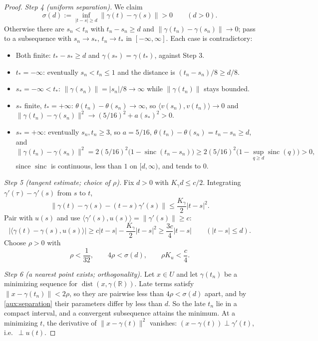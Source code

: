\documentclass[11pt]{article}
\newcommand{\R}{\mathbb R}
\newcommand{\norm}[1]{\lVert #1\rVert}
\newcommand{\ip}[2]{\langle #1,#2\rangle}
\DeclareMathOperator{\dist}{dist}
\DeclareMathOperator{\sinc}{sinc}
\theoremstyle{definition}
\numberwithin{equation}{section}
\begin{document}
\begin{proof}
\emph{Step 4 (uniform separation).} We claim
\begin{equation}\label{aux:separation}
 \sigma(d):=\inf_{|t-s|\ge d}\norm{\gamma(t)-\gamma(s)}>0\qquad(d>0).
\end{equation}
Otherwise there are $s_n<t_n$ with $t_n-s_n\ge d$ and
$\norm{\gamma(t_n)-\gamma(s_n)}\to0$; pass to a subsequence with
$s_n\to s_*$, $t_n\to t_*$ in $[-\infty,\infty]$. Each case is
contradictory:
\begin{itemize}
\item Both finite: $t_*-s_*\ge d$ and $\gamma(s_*)=\gamma(t_*)$,
against Step 3.
\item $t_*=-\infty$: eventually $s_n<t_n\le1$ and the distance is
$(t_n-s_n)/8\ge d/8$.
\item $s_*=-\infty<t_*$: $\norm{\gamma(s_n)}=|s_n|/8\to\infty$ while
$\norm{\gamma(t_n)}$ stays bounded.
\item $s_*$ finite, $t_*=+\infty$: $\theta(t_n)-\theta(s_n)\to\infty$,
so $\ip{v(s_n)}{v(t_n)}\to0$ and
$\norm{\gamma(t_n)-\gamma(s_n)}^2\to(5/16)^2+a(s_*)^2>0$.
\item $s_*=+\infty$: eventually $s_n,t_n\ge3$, so $a=5/16$,
$\theta(t_n)-\theta(s_n)=t_n-s_n\ge d$, and
\[
 \norm{\gamma(t_n)-\gamma(s_n)}^2
 =2(5/16)^2\bigl(1-\sinc(t_n-s_n)\bigr)
 \ge2(5/16)^2\bigl(1-\sup_{q\ge d}\sinc(q)\bigr)>0,
\]
since $\sinc$ is continuous, less than $1$ on $[d,\infty)$, and tends
to $0$.
\end{itemize}

\emph{Step 5 (tangent estimate; choice of $\rho$).} Fix $d>0$ with
$K_\gamma d\le c/2$. Integrating $\gamma'(\tau)-\gamma'(s)$ from $s$ to
$t$,
\[
 \norm{\gamma(t)-\gamma(s)-(t-s)\gamma'(s)}\le\frac{K_\gamma}2|t-s|^2 .
\]
Pair with $u(s)$ and use $\ip{\gamma'(s)}{u(s)}=\norm{\gamma'(s)}\ge c$:
\begin{equation}\label{aux:tangent}
 |\ip{\gamma(t)-\gamma(s)}{u(s)}|
 \ge c|t-s|-\frac{K_\gamma}{2}|t-s|^2\ge\frac{3c}{4}|t-s|
 \qquad(|t-s|\le d).
\end{equation}
Choose $\rho>0$ with
\begin{equation}\label{aux:radius}
 \rho<\frac1{32},\qquad4\rho<\sigma(d),\qquad\rho K_u<\frac c4.
\end{equation}

\emph{Step 6 (a nearest point exists; orthogonality).} Let $x\in U$ and
let $\gamma(t_n)$ be a minimizing sequence for
$\dist(x,\gamma(\R))$. Late terms satisfy
$\norm{x-\gamma(t_n)}<2\rho$, so they are pairwise less than
$4\rho<\sigma(d)$ apart, and by \eqref{aux:separation} their parameters
differ by less than $d$. So the late $t_n$ lie in a compact interval,
and a convergent subsequence attains the minimum. At a minimizing $t$,
the derivative of $\norm{x-\gamma(t)}^2$ vanishes:
$(x-\gamma(t))\perp\gamma'(t)$, i.e.\ $\perp u(t)$.


\end{proof}
\end{document}
